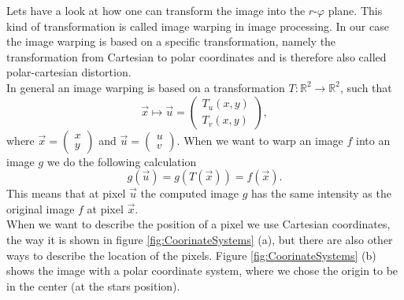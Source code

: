 Lets have a look at how one can transform the image into the $r$-$\varphi$ plane. This kind of transformation is called image warping in image processing. In our case the image warping is based on a specific transformation, namely the transformation from Cartesian to polar coordinates and is therefore also called polar-cartesian distortion.\\
In general an image warping is based on a transformation $T: \mathbb{R}^2 \rightarrow \mathbb{R}^2$, such that 
\begin{equation}
	\vec{x} \mapsto \vec{u} = \begin{pmatrix} T_u(x,y) \\ T_v(x,y) \end{pmatrix},
\end{equation}
where $\vec{x} = \begin{pmatrix} x \\ y \end{pmatrix}$ and $\vec{u} = \begin{pmatrix} u \\ v \end{pmatrix}$. When we want to warp an image $f$ into an image $g$ we do the following calculation
\begin{equation}
	g(\vec{u}) = g(T(\vec{x})) = f(\vec{x}).
\end{equation}
This means that at pixel $\vec{u}$ the computed image $g$ has the same intensity as the original image $f$ at pixel $\vec{x}$. \cite{ImageWarping}\\
When we want to describe the position of a pixel we use Cartesian coordinates, the way it is shown in figure \ref{fig:CoorinateSystems} (a), but there are also other ways to describe the location of the pixels. Figure \ref{fig:CoorinateSystems} (b) shows the image with a polar coordinate system, where we chose the origin to be in the center (at the stars position).
